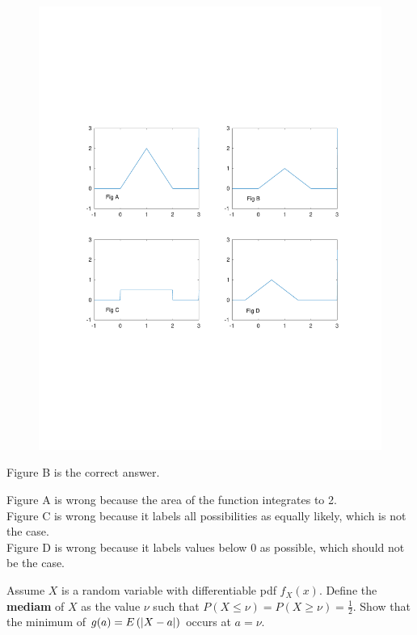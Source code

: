 \documentclass{exam}
\begin{document}
\begin{questions}
\begin{figure}[H] %
\vspace{-1.4in} %
\centering
\includegraphics[scale=.5]{figures/school_work/MTH_464/HW_1/figures.pdf}
\end{figure}

\vspace{-1.4in}
\sol
Figure B is the correct answer.

\newline
Figure A is wrong because the area of the function integrates to 2. \\
Figure C is wrong because it labels all possibilities as equally likely, which is not the case. \\
Figure D is wrong because it labels values below 0 as possible, which should not be the case.


\newpage
\question
Assume $X$ is a random variable with differentiable pdf $f_X(x)$. Define the \textbf{mediam} of $X$ as the value $\nu$ such that $P(X \leq \nu) = P(X \geq \nu) = \frac{1}{2}$. Show that the minimum of $g(a) = E\left( \left| X - a \right| \right)$ occurs at $a = \nu$.


\end{questions}
\end{document}
